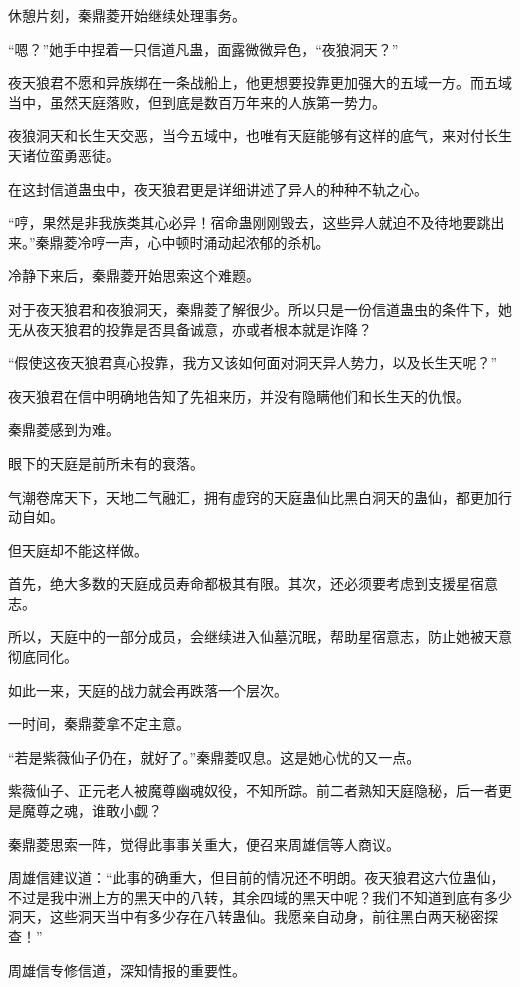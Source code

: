 \begin{this_body}
休憩片刻，秦鼎菱开始继续处理事务。

“嗯？”她手中捏着一只信道凡蛊，面露微微异色，“夜狼洞天？”

夜天狼君不愿和异族绑在一条战船上，他更想要投靠更加强大的五域一方。而五域当中，虽然天庭落败，但到底是数百万年来的人族第一势力。

夜狼洞天和长生天交恶，当今五域中，也唯有天庭能够有这样的底气，来对付长生天诸位蛮勇恶徒。

在这封信道蛊虫中，夜天狼君更是详细讲述了异人的种种不轨之心。

“哼，果然是非我族类其心必异！宿命蛊刚刚毁去，这些异人就迫不及待地要跳出来。”秦鼎菱冷哼一声，心中顿时涌动起浓郁的杀机。

冷静下来后，秦鼎菱开始思索这个难题。

对于夜天狼君和夜狼洞天，秦鼎菱了解很少。所以只是一份信道蛊虫的条件下，她无从夜天狼君的投靠是否具备诚意，亦或者根本就是诈降？

“假使这夜天狼君真心投靠，我方又该如何面对洞天异人势力，以及长生天呢？”

夜天狼君在信中明确地告知了先祖来历，并没有隐瞒他们和长生天的仇恨。

秦鼎菱感到为难。

眼下的天庭是前所未有的衰落。

气潮卷席天下，天地二气融汇，拥有虚窍的天庭蛊仙比黑白洞天的蛊仙，都更加行动自如。

但天庭却不能这样做。

首先，绝大多数的天庭成员寿命都极其有限。其次，还必须要考虑到支援星宿意志。

所以，天庭中的一部分成员，会继续进入仙墓沉眠，帮助星宿意志，防止她被天意彻底同化。

如此一来，天庭的战力就会再跌落一个层次。

一时间，秦鼎菱拿不定主意。

“若是紫薇仙子仍在，就好了。”秦鼎菱叹息。这是她心忧的又一点。

紫薇仙子、正元老人被魔尊幽魂奴役，不知所踪。前二者熟知天庭隐秘，后一者更是魔尊之魂，谁敢小觑？

秦鼎菱思索一阵，觉得此事事关重大，便召来周雄信等人商议。

周雄信建议道：“此事的确重大，但目前的情况还不明朗。夜天狼君这六位蛊仙，不过是我中洲上方的黑天中的八转，其余四域的黑天中呢？我们不知道到底有多少洞天，这些洞天当中有多少存在八转蛊仙。我愿亲自动身，前往黑白两天秘密探查！”

周雄信专修信道，深知情报的重要性。


\end{this_body}
